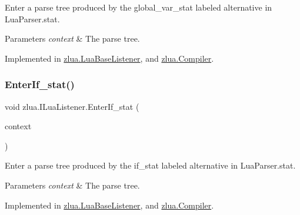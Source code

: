 Enter a parse tree produced by the {\ttfamily global\+\_\+var\+\_\+stat} labeled alternative in Lua\+Parser.\+stat. 


\begin{DoxyParams}{Parameters}
{\em context} & The parse tree.\\
\hline
\end{DoxyParams}


Implemented in \mbox{\hyperlink{classzlua_1_1_lua_base_listener_a67f5bfdbc89b494e4e8474ba4d019326}{zlua.\+Lua\+Base\+Listener}}, and \mbox{\hyperlink{classzlua_1_1_compiler_a303b1c4d7a6cafe7c22c4ae4cdb2d296}{zlua.\+Compiler}}.

\mbox{\label{interfacezlua_1_1_i_lua_listener_ae4466707d78b9bb5f5836ed8710e4ef1}} 
\subsubsection{\texorpdfstring{Enter\+If\+\_\+stat()}{EnterIf\_stat()}}
{\footnotesize\ttfamily void zlua.\+I\+Lua\+Listener.\+Enter\+If\+\_\+stat (\begin{DoxyParamCaption}\item[{\mbox{[}\+Not\+Null\mbox{]} \mbox{\hyperlink{classzlua_1_1_lua_parser_1_1_if__stat_context}{Lua\+Parser.\+If\+\_\+stat\+Context}}}]{context }\end{DoxyParamCaption})}



Enter a parse tree produced by the {\ttfamily if\+\_\+stat} labeled alternative in Lua\+Parser.\+stat. 


\begin{DoxyParams}{Parameters}
{\em context} & The parse tree.\\
\hline
\end{DoxyParams}


Implemented in \mbox{\hyperlink{classzlua_1_1_lua_base_listener_a6c6b8d7541116a14fcaf314180435d4b}{zlua.\+Lua\+Base\+Listener}}, and \mbox{\hyperlink{classzlua_1_1_compiler_af6ae77f24cf841b02733f92d10c21074}{zlua.\+Compiler}}.

\mbox{\label{interfacezlua_1_1_i_lua_listener_a55b4f82ec10a24203046b5f3e9cadfe6}} 
